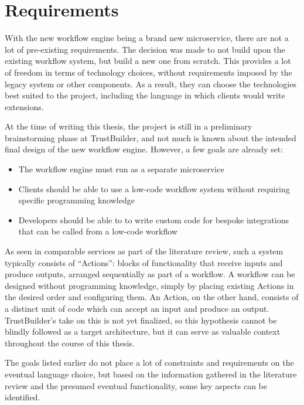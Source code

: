 \chapter{Requirements}
\label{ch:requirements}
With the new workflow engine being a brand new microservice, there are not a lot of pre-existing requirements. The decision was made to not build upon the existing workflow system, but build a new one from scratch. This provides a lot of freedom in terms of technology choices, without requirements imposed by the legacy system or other components. As a result, they can choose the technologies best suited to the project, including the language in which clients would write extensions.

At the time of writing this thesis, the project is still in a preliminary brainstorming phase at TrustBuilder, and not much is known about the intended final design of the new workflow engine. However, a few goals are already set:

\begin{itemize}
    \item The workflow engine must run as a separate microservice
    \item Clients should be able to use a low-code workflow system without requiring specific programming knowledge
    \item Developers should be able to to write custom code for bespoke integrations that can be called from a low-code workflow
\end{itemize}

As seen in comparable services as part of the literature review, such a system typically consists of ``Actions'': blocks of functionality that receive inputs and produce outputs, arranged sequentially as part of a workflow. A workflow can be designed without programming knowledge, simply by placing existing Actions in the desired order and configuring them. An Action, on the other hand, consists of a distinct unit of code which can accept an input and produce an output. TrustBuilder's take on this is not yet finalized, so this hypothesis cannot be blindly followed as a target architecture, but it can serve as valuable context throughout the course of this thesis.

The goals listed earlier do not place a lot of constraints and requirements on the eventual language choice, but based on the information gathered in the literature review and the presumed eventual functionality, some key aspects can be identified.


